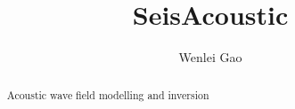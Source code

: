 \documentclass[revised,endfloat]{geophysics}
\begin{document}
\title{SeisAcoustic}
\renewcommand{\thefootnote}{\fnsymbol{footnote}}

\address{
\footnotemark[1]Department of Physics,\\
University of Alberta, \\
Edmonton, Alberta, Canada. \\}

\author{Wenlei Gao\footnotemark[1]} 

\maketitle



\begin{abstract}
Acoustic wave field modelling and inversion
\end{abstract}


\end{document}
